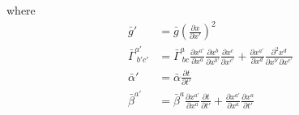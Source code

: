 \documentclass{article}
\begin{document}
where
\begin{align*}
{\bar g}'& = {\bar g}(\frac{\partial x}{\partial x'})^{2}\\
{\bar \Gamma}^{a'}_{~b'c'} & = {\bar \Gamma}^{a}_{~bc}\frac{\partial x^{a'}}{\partial x^{a}}\frac{\partial x^{b}}{\partial x^{b'}}\frac{\partial x^{c}}{\partial x^{c'}} + \frac{\partial x^{a'}}{\partial x^{d}}\frac{\partial^{2} x^{d}}{\partial x^{b'}\partial x^{c'}}\\
{\bar \alpha}' & = {\bar \alpha}\frac{\partial t}{\partial t'}\\
{\bar \beta}^{a'} & = {\bar \beta}^{a}\frac{\partial x^{a'}}{\partial x^{a}}\frac{\partial t}{\partial t'} + \frac{\partial x^{a'}}{\partial x^{a}}\frac{\partial x^{a}}{\partial t'}
\end{align*}
\end{document}
